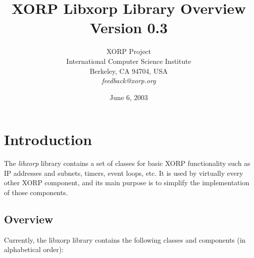 \documentclass[11pt]{article}
\begin{document}
\title{XORP Libxorp Library Overview \\
\vspace{1ex}
Version 0.3}
\author{ XORP Project					\\
	 International Computer Science Institute	\\
	 Berkeley, CA 94704, USA			\\
	 {\it feedback@xorp.org}
}
\date{June 6, 2003}

\maketitle

\thispagestyle{empty}


\section{Introduction}

The \emph{libxorp} library contains a set of classes for basic
XORP functionality such as IP addresses and subnets, timers, event
loops, etc. It is used by virtually every other XORP component, and
its main purpose is to simplify the implementation of those components.

\subsection{Overview}

Currently, the libxorp library contains the following classes and
components (in alphabetical order):
\end{document}
